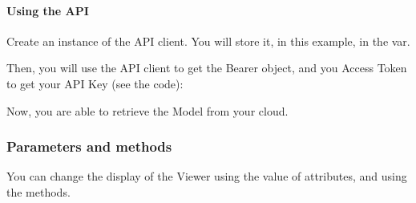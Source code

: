 \documentclass[a4paper,12pt,english]{sphinxmanual}
\begin{document}
\paragraph{Using the API}
\label{\detokenize{viewer/get_your_model_into_the_viewer:using-the-api}}
Create an instance of the API client. You will store it, in this example, in the  var.

%
\begin{sphinxVerbatim}[commandchars=\\\{\}]
   
\end{sphinxVerbatim}

Then, you will use the API client to get the Bearer object, and you Access Token to get your API Key (see the code):

%
\begin{sphinxVerbatim}[commandchars=\\\{\}]
  
   \PYG{p}{[}\PYG{p}{]}
    
\end{sphinxVerbatim}

Now, you are able to retrieve the Model from your cloud.


\subsubsection{Parameters and methods}
\label{\detokenize{viewer/parameters:parameters-and-methods}}\label{\detokenize{viewer/parameters::doc}}
You can change the display of the Viewer using the value of attributes, and using the methods.
\end{document}
